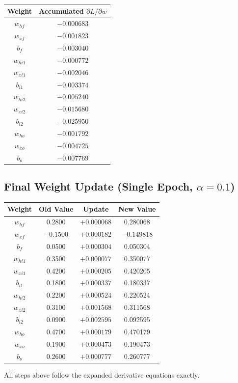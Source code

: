 \documentclass[12pt]{article}
\begin{document}
\begin{center}
\scriptsize
\begin{tabular}{cc}
\toprule
\textbf{Weight} & \textbf{Accumulated $\partial L / \partial w$} \\
\midrule
$w_{hf}$   & $-0.000683$ \\
$w_{xf}$   & $-0.001823$ \\
$b_f$      & $-0.003040$ \\
$w_{hi1}$  & $-0.000772$ \\
$w_{xi1}$  & $-0.002046$ \\
$b_{i1}$   & $-0.003374$ \\
$w_{hi2}$  & $-0.005240$ \\
$w_{xi2}$  & $-0.015680$ \\
$b_{i2}$   & $-0.025950$ \\
$w_{ho}$   & $-0.001792$ \\
$w_{xo}$   & $-0.004725$ \\
$b_o$      & $-0.007769$ \\
\bottomrule
\end{tabular}
\end{center}

\subsection*{Final Weight Update (Single Epoch, $\alpha = 0.1$)}

\begin{center}
\scriptsize
\begin{tabular}{cccc}
\toprule
\textbf{Weight} & \textbf{Old Value} & \textbf{Update} & \textbf{New Value} \\
\midrule
$w_{hf}$  & 0.2800 & $+0.000068$ & 0.280068 \\
$w_{xf}$  & $-0.1500$ & $+0.000182$ & $-0.149818$ \\
$b_f$     & 0.0500 & $+0.000304$ & 0.050304 \\
$w_{hi1}$ & 0.3500 & $+0.000077$ & 0.350077 \\
$w_{xi1}$ & 0.4200 & $+0.000205$ & 0.420205 \\
$b_{i1}$  & 0.1800 & $+0.000337$ & 0.180337 \\
$w_{hi2}$ & 0.2200 & $+0.000524$ & 0.220524 \\
$w_{xi2}$ & 0.3100 & $+0.001568$ & 0.311568 \\
$b_{i2}$  & 0.0900 & $+0.002595$ & 0.092595 \\
$w_{ho}$  & 0.4700 & $+0.000179$ & 0.470179 \\
$w_{xo}$  & 0.1900 & $+0.000473$ & 0.190473 \\
$b_o$     & 0.2600 & $+0.000777$ & 0.260777 \\
\bottomrule
\end{tabular}
\end{center}

All steps above follow the expanded derivative equations exactly.
\end{document}
